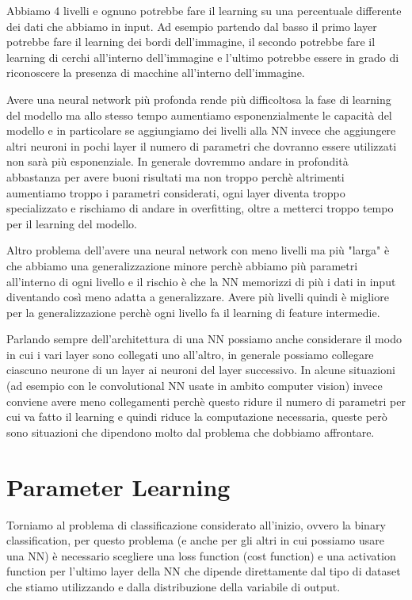 \documentclass[14pt]{extreport}
\begin{document}
Abbiamo 4 livelli e ognuno potrebbe fare il learning su una percentuale differente dei dati che abbiamo in input. Ad esempio partendo dal basso il
primo layer potrebbe fare il learning dei bordi dell'immagine, il secondo potrebbe fare il learning di cerchi all'interno dell'immagine e l'ultimo
potrebbe essere in grado di riconoscere la presenza di macchine all'interno dell'immagine.

Avere una neural network più profonda rende più difficoltosa la fase di learning del modello ma allo stesso tempo aumentiamo esponenzialmente le
capacità del modello e in particolare se aggiungiamo dei livelli alla NN invece che aggiungere altri neuroni in pochi layer il numero di parametri che
dovranno essere utilizzati non sarà più esponenziale. In generale dovremmo andare in profondità abbastanza per avere buoni risultati ma non troppo
perchè altrimenti aumentiamo troppo i parametri considerati, ogni layer diventa troppo specializzato e rischiamo di andare in overfitting, oltre a
metterci troppo tempo per il learning del modello.

Altro problema dell'avere una neural network con meno livelli ma più "larga" è che abbiamo una generalizzazione minore perchè abbiamo più parametri
all'interno di ogni livello e il rischio è che la NN memorizzi di più i dati in input diventando così meno adatta a generalizzare. Avere più livelli
quindi è migliore per la generalizzazione perchè ogni livello fa il learning di feature intermedie.


Parlando sempre dell'architettura di una NN possiamo anche considerare il modo in cui i vari layer sono collegati uno all'altro, in generale possiamo
collegare ciascuno neurone di un layer ai neuroni del layer successivo. In alcune situazioni (ad esempio con le convolutional NN usate in ambito
computer vision) invece conviene avere meno collegamenti perchè questo ridure il numero di parametri per cui va fatto il learning e quindi riduce la
computazione necessaria, queste però sono situazioni che dipendono molto dal problema che dobbiamo affrontare. 

\section{Parameter Learning}

Torniamo al problema di classificazione considerato all'inizio, ovvero la binary classification, per questo problema (e anche per gli altri in cui
possiamo usare una NN) è necessario scegliere una loss function (cost function) e una activation function per l'ultimo layer della NN che dipende
direttamente dal tipo di dataset che stiamo utilizzando e dalla distribuzione della variabile di output.
\end{document}
